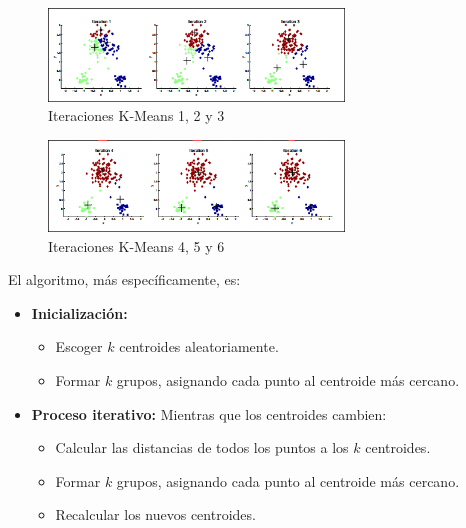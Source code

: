 \documentclass[a4paper, 11pt]{article} %
\begin{document}
\begin{enumerate}
\begin{figure}[H]
\centering
\includegraphics[width=0.7\textwidth]{Iteraciones1a3.PNG}
\caption{Iteraciones K-Means 1, 2 y 3}
\label{Iteraciones K-Means 1, 2 y 3}
\end{figure}

\begin{figure}[H]
\centering
\includegraphics[width=0.7\textwidth]{Iteraciones4a6.PNG}
\caption{Iteraciones K-Means 4, 5 y 6}
\label{Iteraciones K-Means 4, 5 y 6}
\end{figure}


El algoritmo, más específicamente, es:
\begin{itemize}
    \item \textbf{Inicialización:}
    \begin{itemize}
        \item Escoger $k$ centroides aleatoriamente.
        \item Formar $k$ grupos, asignando cada punto al centroide más cercano.
    \end{itemize}
    \item \textbf{Proceso iterativo:}  Mientras que los centroides cambien:
    \begin{itemize}
        \item Calcular las distancias de todos los puntos a los $k$ centroides.
        \item Formar $k$ grupos, asignando cada punto al centroide más cercano.
        \item Recalcular los nuevos centroides.
    \end{itemize}
\end{itemize}
\end{enumerate}
\end{document}
